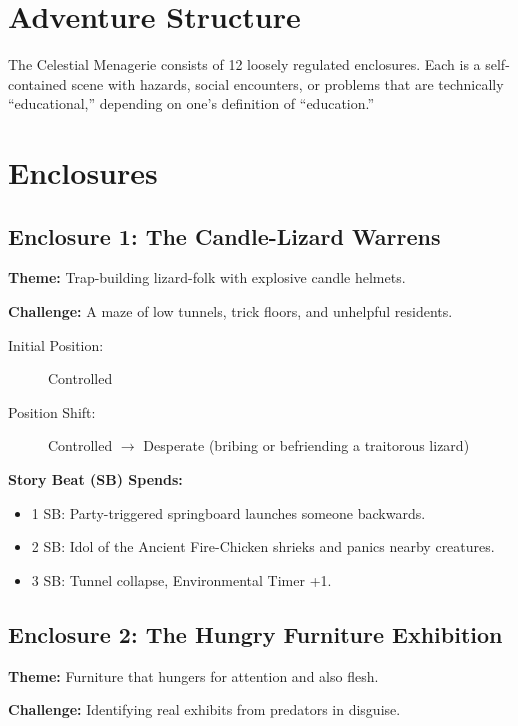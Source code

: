 \section{Adventure Structure}
The Celestial Menagerie consists of 12 loosely regulated enclosures. Each is a self-contained scene with hazards, social encounters, or problems that are technically ``educational,'' depending on one's definition of ``education.''

\bigskip

\section{Enclosures}

\subsection{Enclosure 1: The Candle-Lizard Warrens}
\textbf{Theme:} Trap-building lizard-folk with explosive candle helmets.

\textbf{Challenge:} A maze of low tunnels, trick floors, and unhelpful residents.

\begin{description}
  \item[Initial Position:] Controlled
  \item[Position Shift:] Controlled $\rightarrow$ Desperate (bribing or befriending a traitorous lizard)
\end{description}

\textbf{Story Beat (SB) Spends:}
\begin{itemize}
  \item 1 SB: Party-triggered springboard launches someone backwards.
  \item 2 SB: Idol of the Ancient Fire-Chicken shrieks and panics nearby creatures.
  \item 3 SB: Tunnel collapse, Environmental Timer  +1.
\end{itemize}

\subsection{Enclosure 2: The Hungry Furniture Exhibition}
\textbf{Theme:} Furniture that hungers for attention and also flesh.

\textbf{Challenge:} Identifying real exhibits from predators in disguise.


